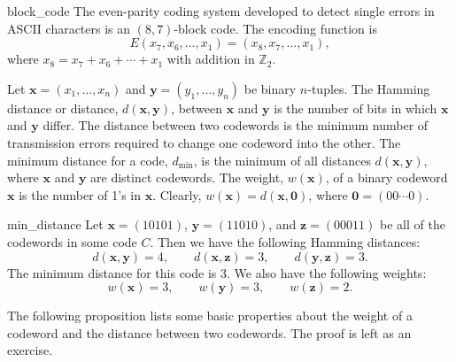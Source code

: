  
\begin{example}{block_code}
The even-parity coding system developed to detect single errors in
ASCII characters is an $(8,7)$-block code. The encoding function is
\[
E(x_7, x_6, \ldots, x_1) = (x_8, x_7,  \ldots, x_1),
\]
where $x_8 = x_7 + x_6 + \cdots + x_1$ with addition in ${\mathbb Z}_2$. 
\end{example}
 
 
Let ${\mathbf x} = (x_1, \ldots, x_n)$ and ${\mathbf y} = (y_1, \ldots,
y_n)$ be binary $n$-tuples. The {\bfi Hamming distance\/} or {\bfi distance}, $d({\mathbf x}, {\mathbf
y})$\label{noteHammingdist}, between ${\mathbf x}$ and ${\mathbf y}$ is
the number of bits in which ${\mathbf x}$ and ${\mathbf y}$ differ. The
distance between two codewords is the minimum number of transmission
errors required to change one codeword into the other. The
{\bfi minimum distance\/} for a code,
$d_{\min}$\label{notemindist}, is the minimum of all distances
$d({\mathbf x}, {\mathbf y})$, where ${\mathbf x}$ and ${\mathbf y}$ are
distinct codewords. The {\bfi weight},
$w({\mathbf x})$\label{noteweight}, of a binary codeword ${\mathbf x}$ is
the number of 1's in ${\mathbf x}$. Clearly, $w({\mathbf x}) = d({\mathbf
x}, {\mathbf 0})$, where ${\mathbf 0} = (00 \cdots 0)$. 
 
 
\begin{example}{min_distance}
Let ${\mathbf x} = (10101)$, ${\mathbf y} = (11010)$, and ${\mathbf z} =
(00011)$ be all of the codewords in some code $C$. Then we have the
following Hamming distances: 
\[
d({\mathbf x},{\mathbf y}) = 4, \qquad
d({\mathbf x},{\mathbf z}) = 3, \qquad
d({\mathbf y},{\mathbf z}) = 3.
\]
The minimum distance  for this code is 3. We also have the
following weights: 
\[
w({\mathbf x}) = 3, \qquad
w({\mathbf y}) = 3, \qquad
w({\mathbf z}) = 2.
\]
\end{example}
 
 
The following proposition lists some basic properties about the weight
of a codeword and the distance between two codewords. The proof is
left as an exercise.
 
